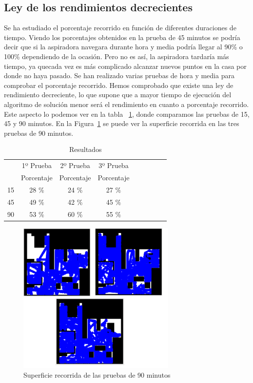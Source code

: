 \subsection{Ley de los rendimientos decrecientes}

Se ha estudiado el porcentaje recorrido en función de diferentes duraciones de tiempo. Viendo los porcentajes obtenidos en la prueba de 45 minutos se podría decir que si la aspiradora navegara durante hora y media podría llegar al 90\% o 100\% dependiendo de la ocasión. Pero no es así, la aspiradora tardaría más tiempo, ya quecada vez es más complicado alcanzar nuevos puntos en la casa por donde no haya pasado. Se han realizado varias pruebas de hora y media para comprobar el porcentaje recorrido. Hemos comprobado que existe una ley de rendimiento decreciente, lo que supone que a mayor tiempo de ejecución del algoritmo de solución menor será el rendimiento en cuanto a porcentaje recorrido. Este aspecto lo podemos ver en la tabla ~\ref{resultados_periodos}, donde comparamos las pruebas de 15, 45 y 90 minutos. En la Figura~\ref{fig.Referee_hora} se puede ver la superficie recorrida en las tres pruebas de 90 minutos.

\begin{table}[]
\centering
\caption{Resultados}
\label{resultados_periodos}
\begin{tabular}{c|c|c|c|c|c|c|c|c|}
\cline{2-4}
                          & \multicolumn{1}{c|}{1º Prueba} & \multicolumn{1}{c|}{2º Prueba} & \multicolumn{1}{c|}{3º Prueba} \\ \cline{2-4} 
                         & Porcentaje       & Porcentaje       & Porcentaje     \\ \hline
\multicolumn{1}{|c|}{15} & 28 \%            & 24 \%            & 27 \%          \\ \hline
\multicolumn{1}{|c|}{45} & 49 \%            & 42 \%            & 45 \%          \\ \hline
\multicolumn{1}{|c|}{90} & 53 \%            & 60 \%            & 55 \%          \\ \hline
\end{tabular}
\end{table}

\begin{figure}[H]
  \begin{center}
    \includegraphics[width=0.7\textwidth]{figures/Vacuum/Referee_hora.png}
		\caption{Superficie recorrida de las pruebas de 90 minutos}
		\label{fig.Referee_hora}
		\end{center}
\end{figure}